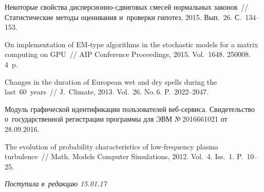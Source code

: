 \begin{multicols}{2}
{{\begin{thebibliography}{99}
  
Некоторые свойства дис\-пер\-си\-он\-но-сдви\-го\-вых смесей нормальных законов~// 
Статистические методы оценивания и~проверки гипотез, 2015. Вып.~26. С.~134--153.

  
On implementation of EM-type algorithms in the 
stochastic models for a matrix computing on GPU~// AIP Conference Proceedings, 
2015. Vol.~1648. 250008. 4~p.

  
Changes in the duration of European wet and dry spells during the last~60~years~// 
J.~Climate, 2013. Vol.~26. No.\,6. P.~2022--2047.

  
Модуль графической идентификации пользователей веб-сер\-ви\-са. 
Свидетельство о~государственной регистрации программы для ЭВМ 
№\,2016661021 от 28.09.2016.

The evolution of probability characteristics of low-frequency plasma turbulence~// 
Math. Models Computer Simulations, 2012. Vol.~4. Iss.~1. P.~10--25.

 \end{thebibliography}

 }
 }

\end{multicols}

\vspace*{-3pt}

\hfill{\small\textit{Поступила в~редакцию 15.01.17}}


\newpage

\vspace*{-24pt}







\def\tit{ON SOME MATHEMATICAL AND~PROGRAMMING METHODS FOR~CONSTRUCTION 
OF~STRUCTURAL MODELS OF~INFORMATION FLOWS}

\def\titkol{On some mathematical and programming methods for~construction of structural models of~information flows}

